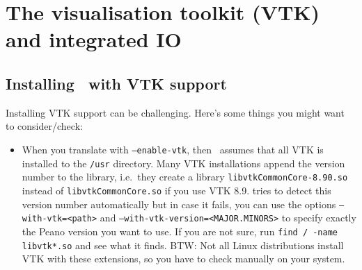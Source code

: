 \chapter{The visualisation toolkit (VTK) and integrated IO}
\label{chapter:vtk}

\section{Installing \Peano\ with VTK support}
Installing VTK support can be challenging. 
Here's some things you might want to consider/check:

\begin{itemize}
  \item When you translate with \texttt{--enable-vtk}, then \Peano\ assumes that
  all VTK is installed to the \texttt{/usr} directory. Many VTK
  installations append the version number to the library, i.e.~they
  create a library \texttt{libvtkCommonCore-8.90.so} instead of
  \texttt{libvtkCommonCore.so} if you use VTK 8.9. 
  \Peano tries to detect this version number automatically but in case it fails,
  you can use the options \texttt{--with-vtk=<path>} and \texttt{--with-vtk-version=<MAJOR.MINORS>}
  to specify exactly the Peano version you want to use.
  If you are not sure, run \texttt{find / -name libvtk*.so} and see what it finds. 
  BTW: Not all Linux distributions install VTK with these extensions, so you
  have to check manually on your system.


\end{itemize}
